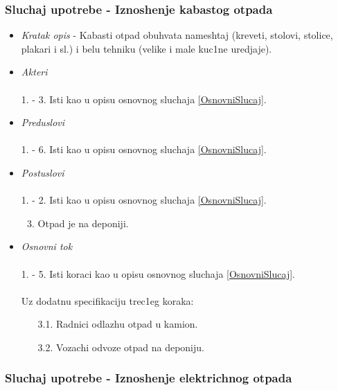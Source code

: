 \documentclass[10 pt]{article}
\begin{document}
	\subsubsection{Sluchaj upotrebe - Iznoshenje kabastog otpada}
		
		\begin{itemize}
			\item\textit{Kratak opis} - Kabasti otpad obuhvata nameshtaj (kreveti, stolovi, stolice, plakari i sl.) i belu tehniku (velike i male kuc1ne uredjaje).
			
			\item\textit{Akteri}\\\\ 
			1. - 3. Isti kao u opisu osnovnog sluchaja \ref{OsnovniSlucaj}. 
			
			\item\textit{Preduslovi}\\\\ 
			1. - 6. Isti kao u opisu osnovnog sluchaja \ref{OsnovniSlucaj}.
			
			\item\textit{Postuslovi}\\\\
			1. - 2. Isti kao u opisu osnovnog sluchaja \ref{OsnovniSlucaj}.
				\begin{enumerate}
					\setcounter{enumi}{2}
					\item Otpad je na deponiji.
				\end{enumerate}
			
			\item\textit{Osnovni tok}\\\\
			1. - 5. Isti koraci kao u opisu osnovnog sluchaja \ref{OsnovniSlucaj}.\\\\
			Uz dodatnu specifikaciju trec1eg koraka:
				\begin{enumerate}
					\item [3.1.] Radnici odlazhu otpad u kamion.
					\item [3.2.] Vozachi odvoze otpad na deponiju.
				\end{enumerate}

		\end{itemize}
	
	\subsubsection{Sluchaj upotrebe - Iznoshenje elektrichnog otpada}
		
\end{document}
